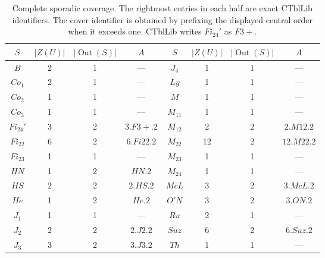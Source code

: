 \begin{table}[ht]
\centering\small
\begin{tabular}{c|c|c|c@{\qquad}c|c|c|c}
$S$&$|Z(U)|$&$|\operatorname{Out}(S)|$&$A$&
$S$&$|Z(U)|$&$|\operatorname{Out}(S)|$&$A$\\ \hline
$B$&2&1&---&$J_4$&1&1&---\\
$Co_1$&2&1&---&$Ly$&1&1&---\\
$Co_2$&1&1&---&$M$&1&1&---\\
$Co_3$&1&1&---&$M_{11}$&1&1&---\\
$Fi_{24}'$&3&2&$3.F3+.2$&$M_{12}$&2&2&$2.M12.2$\\
$Fi_{22}$&6&2&$6.Fi22.2$&$M_{22}$&12&2&$12.M22.2$\\
$Fi_{23}$&1&1&---&$M_{23}$&1&1&---\\
$HN$&1&2&$HN.2$&$M_{24}$&1&1&---\\
$HS$&2&2&$2.HS.2$&$McL$&3&2&$3.McL.2$\\
$He$&1&2&$He.2$&$O'N$&3&2&$3.ON.2$\\
$J_1$&1&1&---&$Ru$&2&1&---\\
$J_2$&2&2&$2.J2.2$&$Suz$&6&2&$6.Suz.2$\\
$J_3$&3&2&$3.J3.2$&$Th$&1&1&---
\end{tabular}
\caption{Complete sporadic coverage.  The rightmost entries in each
half are exact CTblLib identifiers.  The cover identifier is obtained
by prefixing the displayed central order when it exceeds one.
CTblLib writes $Fi_{24}'$ as $F3+$.}
\label{tab:sporadic-coverage}
\end{table}

